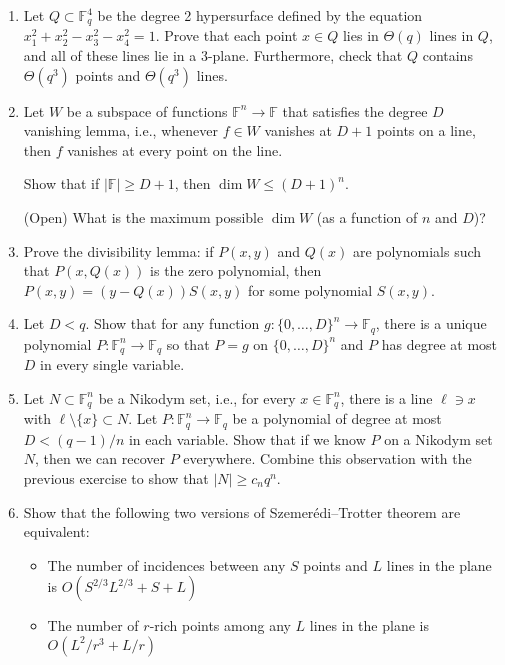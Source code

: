 \documentclass{article}
\newcommand{\FF}{\mathbb{F}}
\begin{document}
\begin{enumerate}
\item

Let $Q \subset \FF_{q}^4$ be the degree 2 hypersurface defined by the equation $x_1^2 + x_2^2 - x_3^2 - x_4^2 = 1$. Prove that each point $x \in Q$ lies in $\Theta(q)$ lines in $Q$, and all of these lines lie in a 3-plane. Furthermore, check that $Q$ contains $\Theta(q^3)$ points and $\Theta(q^3)$ lines.

\item

Let $W$ be a subspace of functions $\FF^n \to \FF$ that satisfies the degree $D$ vanishing lemma, i.e., whenever $f \in W$ vanishes at $D+1$ points on a line, then $f$ vanishes at every point on the line.

Show that if $|\FF|\ge D+1$, then $\dim W \le (D+1)^n$.

(Open) What is the maximum possible $\dim W$ (as a function of $n$ and $D$)?

\item

Prove the divisibility lemma: if $P(x,y)$ and $Q(x)$ are polynomials such that $P(x,Q(x))$ is the zero polynomial, then $P(x,y) = (y-Q(x))S(x,y)$ for some polynomial $S(x,y)$.

\item

Let $D < q$. Show that for any function $g \colon \{0, \dots, D\}^n \to \FF_q$, there is a unique polynomial $P \colon \FF_q^n \to \FF_q$ so that $P = g$ on $\{0, \dots, D\}^n$ and $P$ has degree at most $D$ in every single variable.

\item

Let $N \subset \FF_q^n$ be a Nikodym set, i.e., for every $x \in \FF_q^n$, there is a line $\ell \ni x$ with $\ell \setminus \{x\} \subset N$. Let $P \colon \FF_q^n \to \FF_q$ be a polynomial of degree at most $D < (q-1)/n$ in each variable. Show that if we know $P$ on a Nikodym set $N$, then we can recover $P$ everywhere. Combine this observation with the previous exercise to show that $|N| \ge c_n q^n$.

\item

Show that the following two versions of Szemerédi--Trotter theorem are equivalent:

\begin{itemize}
	\item The number of incidences between any $S$ points and $L$ lines in the plane is $O(S^{2/3}L^{2/3} + S +L)$
	\item The number of $r$-rich points among any $L$ lines in the plane is $O(L^2/r^3 + L/r)$
\end{itemize}


\end{enumerate}
\end{document}
